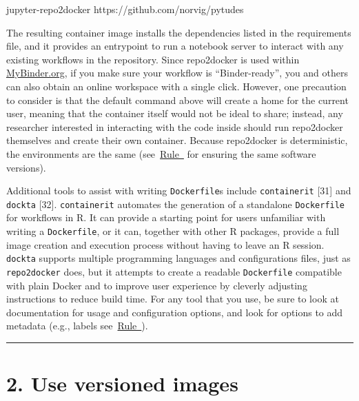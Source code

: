\documentclass[10pt,letterpaper]{article}
\newenvironment{Shaded}{\begin{snugshade}}{\end{snugshade}}
\newcommand{\ExtensionTok}[1]{#1}
\newcommand{\NormalTok}[1]{#1}
\begin{document}
\footnotesize

\begin{Shaded}
\begin{Highlighting}[]
\ExtensionTok{jupyter-repo2docker}\NormalTok{ https://github.com/norvig/pytudes}
\end{Highlighting}
\end{Shaded}

\normalsize

The resulting container image installs the dependencies listed in the
requirements file, and it provides an entrypoint to run a notebook
server to interact with any existing workflows in the repository. Since
repo2docker is used within \href{https://mybinder.org/}{MyBinder.org},
if you make sure your workflow is ``Binder-ready'', you and others can
also obtain an online workspace with a single click. However, one
precaution to consider is that the default command above will create a
home for the current user, meaning that the container itself would not
be ideal to share; instead, any researcher interested in interacting
with the code inside should run repo2docker themselves and create their
own container. Because repo2docker is deterministic, the environments
are the same
(see~\hyperref[{rule:pinning}]{Rule~} for
ensuring the same software versions).

Additional tools to assist with writing \texttt{Dockerfile}s include
\texttt{containerit} {[}31{]} and \texttt{dockta} {[}32{]}.
\texttt{containerit} automates the generation of a standalone
\texttt{Dockerfile} for workflows in R. It can provide a starting point
for users unfamiliar with writing a \texttt{Dockerfile}, or it can,
together with other R packages, provide a full image creation and
execution process without having to leave an R session. \texttt{dockta}
supports multiple programming languages and configurations files, just
as \texttt{repo2docker} does, but it attempts to create a readable
\texttt{Dockerfile} compatible with plain Docker and to improve user
experience by cleverly adjusting instructions to reduce build time. For
any tool that you use, be sure to look at documentation for usage and
configuration options, and look for options to add metadata (e.g.,
labels see~\hyperref[{rule:document}]{Rule~}).

\begin{center}\rule{0.5\linewidth}{0.5pt}\end{center}

\hypertarget{use-versioned-images}{%
\section*{2. Use versioned images}\label{use-versioned-images}}
\end{document}
